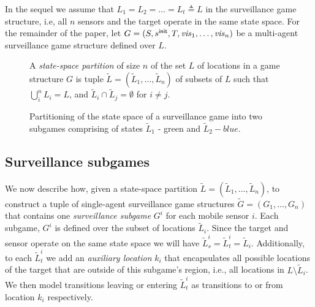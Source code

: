 In the sequel we assume that $L_1 = L_2 = \dots = L_t \triangleq L$  in the surveillance game structure, i.e, all $n$ sensors and the target operate in the same state space. For the remainder of the paper, let $G=(S,s^{\mathsf{init}},T,\mathit{vis}_1,\ldots,\mathit{vis}_n)$ be a multi-agent surveillance game structure  defined over  $L$.

\begin{figure}
A  \emph{state-space partition} of size $n$ of the set $L$ of locations in a game structure $G$ is tuple $\widetilde L =  (\widetilde L_1,\ldots,\widetilde L_n)$ of subsets of $L$ such that  $\bigcup_i^n L_i = L $, and $\widetilde L_i \cap \widetilde L_j  = \emptyset$ for $i \neq j$. 

{}


\caption{Partitioning of the state space of a surveillance game into two subgames comprising of states $\widetilde{L}_1$ - green and $\widetilde{L}_2 - blue$. }
\label{fig:simple-dist-game}
\end{figure}

\subsection{Surveillance subgames}
We now describe how, given a state-space partition $\widetilde L =  (\widetilde L_1,\ldots,\widetilde L_n)$, to construct a tuple of single-agent surveillance game structures $\widetilde G = (G_1,\ldots,G_n)$ that contains one  \emph{surveillance subgame} $G^i$ for each mobile sensor  $i$. Each subgame, $G^i$ is defined over the subset of locations $\widetilde{L}_i$. Since the target and sensor operate on the same state space we will have $\widetilde{L}^i_s = \widetilde{L}^i_t = \widetilde{L}_i$. Additionally, to each $\widetilde{L}^i_t$ we add an \emph{auxiliary location} $k_i$ that encapsulates all possible locations of the target that are outside of this subgame's region, i.e., all locations in $L \setminus \widetilde{L}_i$.  We then model transitions leaving or entering $\widetilde{L}^i_t$ as transitions to or from location $k_i$ respectively.

